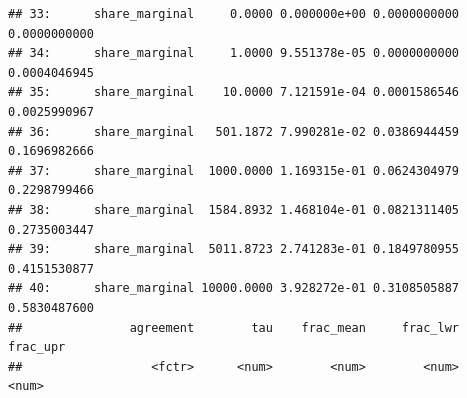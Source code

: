 \documentclass[
  11pt,
]{article}
\begin{document}
\begin{verbatim}
## 33:      share_marginal     0.0000 0.000000e+00 0.0000000000 0.0000000000
## 34:      share_marginal     1.0000 9.551378e-05 0.0000000000 0.0004046945
## 35:      share_marginal    10.0000 7.121591e-04 0.0001586546 0.0025990967
## 36:      share_marginal   501.1872 7.990281e-02 0.0386944459 0.1696982666
## 37:      share_marginal  1000.0000 1.169315e-01 0.0624304979 0.2298799466
## 38:      share_marginal  1584.8932 1.468104e-01 0.0821311405 0.2735003447
## 39:      share_marginal  5011.8723 2.741283e-01 0.1849780955 0.4151530877
## 40:      share_marginal 10000.0000 3.928272e-01 0.3108505887 0.5830487600
##               agreement        tau    frac_mean     frac_lwr     frac_upr
##                  <fctr>      <num>        <num>        <num>        <num>
\end{verbatim}
\end{document}
